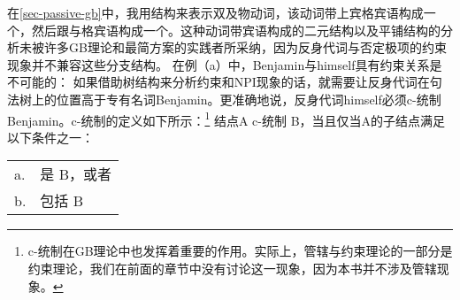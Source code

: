 在\ref{sec-passive-gb}中，我用\xbarc 结构来表示双及物动词，该动词带上宾格宾语构成一个\vbarc，然后跟与格宾语构成一个\vbarc。这种动词带宾语构成\vbarc 的二元结构以及平铺结构的分析未被许多GB理论和最简方案的实践者所采纳，因为反身代词与否定极项的约束现象并不兼容这些分支结构。
在例（a）中，Benjamin与himself具有约束关系是不可能的：
\eal
{}
\zl
如果借助树结构来分析约束和NPI现象的话，就需要让反身代词在句法树上的位置高于专有名词Benjamin。更准确地说，反身代词himself必须c-统制Benjamin。c-统制的定义如下所示\citep[]{Adger2003a}：\footnote{%
c-统制在GB理论中也发挥着重要的作用。实际上，管辖与约束理论的一部分是约束理论，我们在前面的章节中没有讨论这一现象，因为本书并不涉及管辖现象。
}
\ea
结点A c-统制 B，当且仅当A的子结点满足以下条件之一：\\
\begin{tabular}[t]{@{}l@{~}l@{}}
a. & 是 B，或者\\
b. & 包括 B
\end{tabular}
\z

